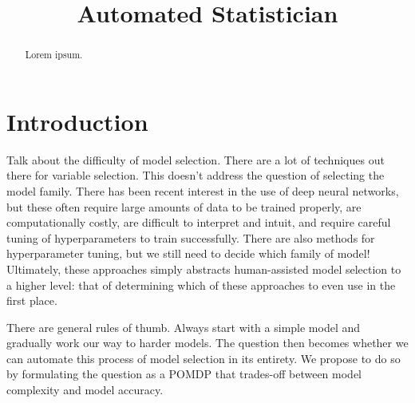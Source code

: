 \documentclass{article}
\title{Automated Statistician}
\begin{document}
 


\begin{abstract} 
Lorem ipsum.
\end{abstract} 

\section{Introduction}
Talk about the difficulty of model selection. There are a lot of techniques out there for variable selection. This doesn't address the question of selecting the model family. There has been recent interest in the use of deep neural networks, but these often require large amounts of data to be trained properly, are computationally costly, are difficult to interpret and intuit, and require careful tuning of hyperparameters to train successfully. There are also methods for hyperparameter tuning, but we still need to decide which family of model! Ultimately, these approaches simply abstracts human-assisted model selection to a higher level: that of determining which of these approaches to even use in the first place. 

There are general rules of thumb. Always start with a simple model and gradually work our way to harder models. The question then becomes whether we can automate this process of model selection in its entirety. We propose to do so by formulating the question as a POMDP that trades-off between model complexity and model accuracy.
\end{document}
